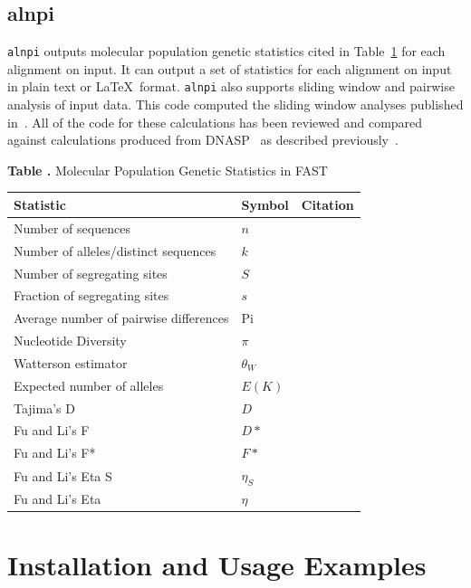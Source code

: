 \documentclass{frontiersSCNS} %
\begin{document}
\subsection{alnpi}
    
{\tt alnpi} outputs molecular population genetic statistics cited in
Table~\ref{tab:pgstats} for each alignment on input. It can output a
set of statistics for each alignment on input in plain text or
\LaTeX~format. {\tt alnpi} also supports sliding window and pairwise
analysis of input data. This code computed the sliding window analyses
published in~\citep{Ardell03}. All of the code for these calculations has
been reviewed and compared against calculations produced from
DNASP~\citep{Librado01062009} as described previously~\citep{Ardell12082004}.

\begin{table}[!t]
\textbf{\label{tab:pgstats} Table .}{
  Molecular Population Genetic Statistics in FAST }

\processtable{ }
{\begin{tabular}{lll}\toprule
    Statistic  & Symbol  & Citation \\
\midrule
Number of sequences & $n$ & \\
Number of alleles/distinct sequences & $k$ & \\
Number of segregating sites & $S$ & \\
Fraction of segregating sites & $s$ & \\
Average number of pairwise differences & Pi & \citep{NeiLi79} \\
Nucleotide Diversity & $\pi$ &  \citep{NeiLi79} \\
Watterson estimator & $\theta_W$ & \citep{watterson1975number} \\
Expected number of alleles & $E(K)$ & \citep{ewens1972sampling} \\
Tajima's D & $D$ & \citep{Tajima89c} \\
Fu and Li's F & $D*$ & \citep{FuLi93b} \\
Fu and Li's F* & $F*$ & \citep{FuLi93b,SimonsenEtAl95} \\
Fu and Li's Eta S & $\eta_S$ &  \citep{FuLi93b} \\
Fu and Li's Eta & $\eta$ &  \citep{FuLi93b} \\
\end{tabular}}{}
\end{table}


\section{Installation and Usage Examples}
\end{document}
